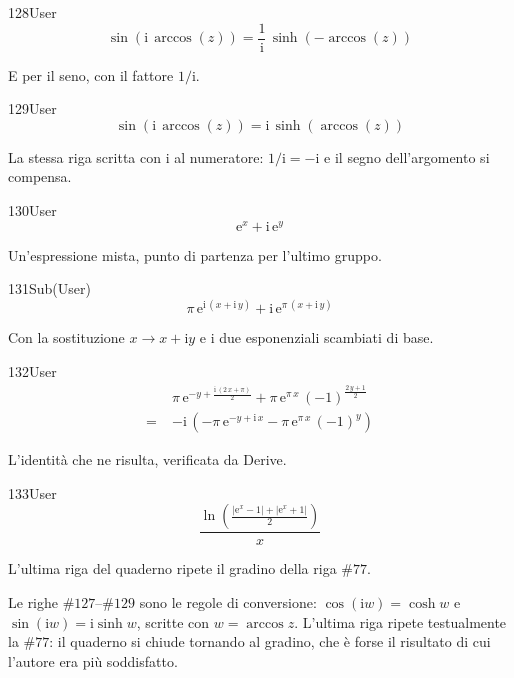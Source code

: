 \begin{espr}{128}{User}{\verificata}
\[
\sin\!\left(\mathrm{i}\, \arccos\!\left(z\right)\right) = \frac{1}{\mathrm{i}}\, \sinh\!\left(-\arccos\!\left(z\right)\right)
\]
\end{espr}
E per il seno, con il fattore $1/\mathrm{i}$.

\begin{espr}{129}{User}{\verificata}
\[
\sin\!\left(\mathrm{i}\, \arccos\!\left(z\right)\right) = \mathrm{i}\, \sinh\!\left(\arccos\!\left(z\right)\right)
\]
\end{espr}
La stessa riga scritta con $\mathrm{i}$ al numeratore: $1/\mathrm{i}=-\mathrm{i}$ e il segno dell'argomento si compensa.

\begin{espr}{130}{User}{}
\[
\mathrm{e}^{x} + \mathrm{i}\, \mathrm{e}^{y}
\]
\end{espr}
Un'espressione mista, punto di partenza per l'ultimo gruppo.

\begin{espr}{131}{Sub(User)}{}
\[
\pi\, \mathrm{e}^{\mathrm{i}\, \left(x + \mathrm{i}\, y\right)} + \mathrm{i}\, \mathrm{e}^{\pi\, \left(x + \mathrm{i}\, y\right)}
\]
\end{espr}
Con la sostituzione $x\to x+\mathrm{i}y$ e i due esponenziali scambiati di base.

\begin{espr}{132}{User}{\verificata}
\begin{align*}
& \pi\, \mathrm{e}^{-y + \frac{\mathrm{i}\, \left(2\, x + \pi\right)}{2}} + \pi\, \mathrm{e}^{\pi\, x}\, \left(-1\right)^{\frac{2\, y + 1}{2}} \\
=\;& -\mathrm{i}\, \left(-\pi\, \mathrm{e}^{-y + \mathrm{i}\, x} - \pi\, \mathrm{e}^{\pi\, x}\, \left(-1\right)^{y}\right)
\end{align*}
\end{espr}
L'identità che ne risulta, verificata da Derive.

\begin{espr}{133}{User}{}
\[
\frac{\ln\!\left(\frac{\left|\mathrm{e}^{x} - 1\right| + \left|\mathrm{e}^{x} + 1\right|}{2}\right)}{x}
\]
\end{espr}
L'ultima riga del quaderno ripete il gradino della riga $\#77$.


Le righe $\#127$--$\#129$ sono le regole di conversione: $\cos(\mathrm{i}w)=\cosh w$ e $\sin(\mathrm{i}w)=\mathrm{i}\sinh w$, scritte con $w=\arccos z$. L'ultima riga ripete testualmente la $\#77$: il quaderno si chiude tornando al gradino, che è forse il risultato di cui l'autore era più soddisfatto.


